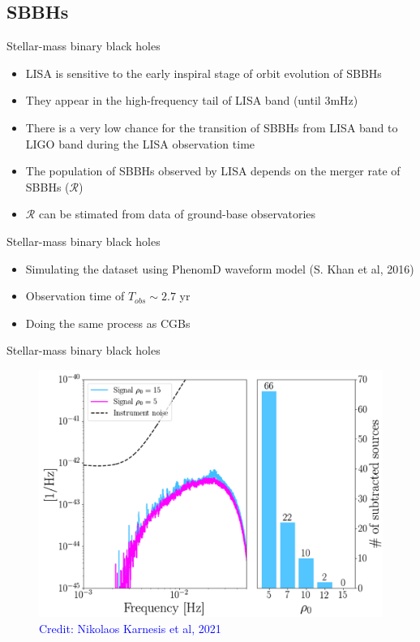 \documentclass[pdf]{beamer}
\newcommand{\credit}[1]{\tiny{\textcolor{blue}{Credit: #1}}}
\begin{document}
\subsection{SBBHs}
\begin{frame}{Stellar-mass binary black holes}
\begin{itemize}
\item LISA is sensitive to the early inspiral stage of orbit evolution of SBBHs
\item They appear in the high-frequency tail of LISA band (until $3\mathrm{mHz}$)
\item There is a very low chance for the transition of SBBHs from LISA band to LIGO band during the LISA observation time
\item The population of SBBHs observed by LISA depends on the merger rate of SBBHs ($\mathcal{R}$)
\item $\mathcal{R}$ can be stimated from data of ground-base observatories
\end{itemize}
\end{frame}

\begin{frame}{Stellar-mass binary black holes}
\begin{itemize}
\item Simulating the dataset using PhenomD waveform model (S. Khan et al, 2016)
\item Observation time of $T_{obs} \sim 2.7$ yr
\item Doing the same process as CGBs
\end{itemize}
\end{frame}

\begin{frame}{Stellar-mass binary black holes}
\begin{figure}
\includegraphics[width=.8\textwidth]{fig/SMBHs.png}
\caption*{\credit{Nikolaos Karnesis et al, 2021}}
\end{figure}
\end{frame}
\end{document}
